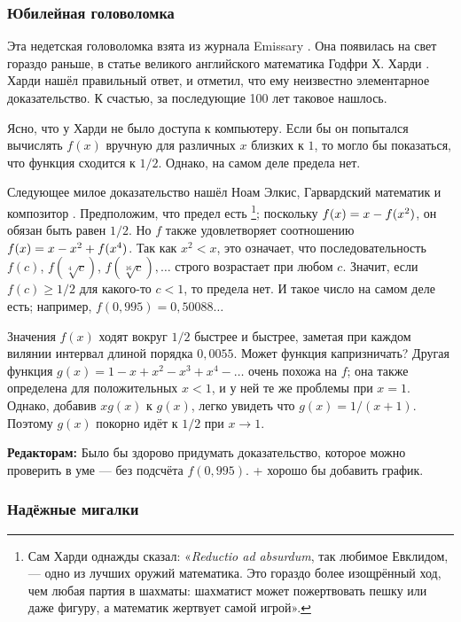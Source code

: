\subsubsection*{Юбилейная головоломка}

Эта недетская головоломка взята из журнала Emissary \cite[Осень 2004]{3}.
Она появилась на свет гораздо раньше, в статье великого английского математика Годфри Х. Харди \cite{37}. 
Харди нашёл правильный ответ, и отметил, что ему неизвестно элементарное доказательство.
К счастью, за последующие 100 лет таковое нашлось.

Ясно, что у Харди не было доступа к компьютеру.
Если бы он попытался вычислять $f(x)$ вручную для различных $x$ близких к $1$, то могло бы показаться, что функция сходится к $1/2$.
Однако, на самом деле предела нет.

Следующее милое доказательство нашёл Ноам Элкис, Гарвардский математик и композитор \cite[Problem 8]{elkies}.
Предположим, что предел есть%
\footnote{Сам Харди однажды сказал: «\emph{Reductio ad absurdum}, так любимое Евклидом, --- одно из лучших оружий математика.
Это гораздо более изощрённый ход, чем любая партия в шахматы:
шахматист может пожертвовать пешку или даже фигуру, а математик жертвует самой игрой».};
поскольку $f(x)\z=x\z-f(x^2)$, он обязан быть равен $1/2$.
Но $f$ также удовлетворяет соотношению $f(x)\z=x\z-x^2\z+f(x^4)$.
Так как $x^2 < x$, это означает, что последовательность $f(c)$, $f(\sqrt[4]{c})$, $f(\sqrt[16]{c}),\dots$ строго возрастает при любом $c$.
Значит, если $f(c)\ge1/2$ для какого-то $c<1$, то предела нет.
И такое число на самом деле есть; например, $f(0{,}995)=0{,}50088\dots$

Значения $f(x)$ ходят вокруг $1/2$ быстрее и быстрее, заметая при каждом вилянии интервал длиной порядка $0{,}0055$. 
Может функция капризничать?
Другая функция $g(x)=1-x+x^2-x^3+x^4-\dots$ очень похожа на $f$;
она также определена для положительных $x < 1$, и у ней те же проблемы при $x = 1$.
Однако, добавив $xg(x)$ к $g(x)$, легко увидеть что $g(x)=1/(x+1)$.
Поэтому $g(x)$ покорно идёт к $1/2$ при $x \to 1$.

\begin{addedbytheeditors}
\textbf{Редакторам:}
Было бы здорово придумать доказательство, которое можно проверить в уме --- без подсчёта $f(0{,}995)$.
+ хорошо бы добавить график.
\end{addedbytheeditors}

\subsubsection*{Надёжные мигалки}

